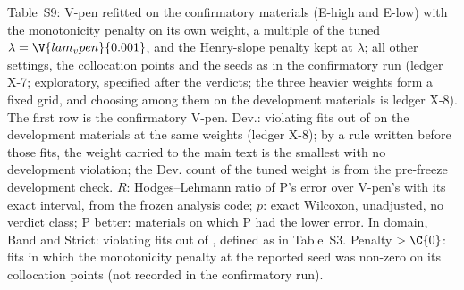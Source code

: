 \documentclass[11pt]{article}
\begin{document}
\begin{table}[h]
\centering
\caption*{Table~S9: V-pen refitted on the  confirmatory materials (E-high and E-low) with the
monotonicity penalty on its own weight, a multiple of the tuned $\lambda = \V{lam_vpen}{0.001}$, and the Henry-slope
penalty kept at $\lambda$; all other settings, the collocation points and the  seeds as in the
confirmatory run (ledger X-7; exploratory, specified after the verdicts; the three heavier weights form a fixed grid, and
choosing among them on the development materials is ledger X-8). The first row is the confirmatory V-pen. Dev.: violating fits out of  on
the  development materials at the same weights (ledger X-8); by a rule written before those
fits, the weight carried to the main text is the smallest with no development violation; the Dev. count of the
tuned weight is from the pre-freeze development check.
$R$: Hodges--Lehmann ratio of P's error over V-pen's with its exact interval, from the frozen analysis code; $p$:
exact Wilcoxon, unadjusted, no verdict class; P better: materials on which P had the lower error. In domain, Band and
Strict: violating fits out of , defined as in Table~S3. Penalty $>\C{0}$: fits in which the monotonicity penalty
at the reported seed was non-zero on its collocation points (not recorded in the confirmatory run).}

\end{table}


\end{document}
